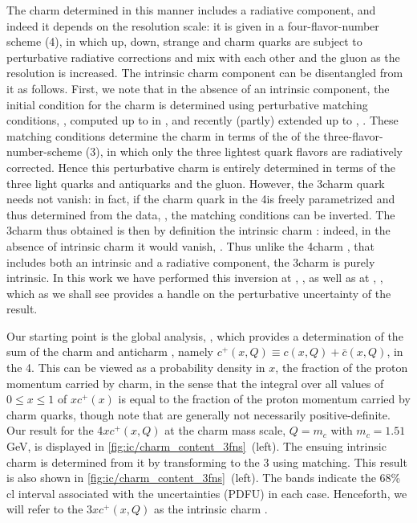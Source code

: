 The charm \pdf determined in this manner includes a  radiative component, and
indeed it depends on the resolution scale: it is  given in a four-flavor-number
scheme (4\fns), in which up,  down, strange and charm quarks are subject to 
perturbative radiative corrections and mix with each other and the gluon as the
resolution is increased.
%
The intrinsic charm component can be disentangled from it as follows.
%
First, we note that in the absence of an intrinsic component, the initial
condition for the charm \pdf is determined using perturbative matching
conditions, \cite{Collins:1986mp}, computed  up to \nnlo in \cite{pdfnnlo},
and recently (partly) extended up to \nnnlo,
\cite{Bierenbaum:2009zt,Bierenbaum:2009mv,Ablinger:2010ty,Ablinger:2014vwa,Ablinger:2014uka,Behring:2014eya,Ablinger_2014,Ablinger:2014nga,Blumlein:2017wxd}.
%
These matching conditions  determine the charm \pdf in terms of the \pdfs of
the three-flavor-number-scheme (3\fns), in which only the three lightest quark 
flavors are radiatively corrected.
%
Hence this perturbative charm \pdf is entirely determined in terms of the three
light quarks and antiquarks and the gluon.
%
However, the 3\fns charm quark \pdf needs not vanish: in fact, if the charm
quark \pdf in the 4\fns is freely parametrized and thus determined from the
data, \cite{Ball:2015tna}, the matching conditions can be inverted.
%
The 3\fns charm \pdf thus obtained is then by definition the intrinsic charm
\pdf: indeed, in the absence of intrinsic charm it would
vanish, \cite{Ball:2015dpa}. 
Thus unlike the 4\fns charm \pdf, that includes both an intrinsic and a
radiative component, the 3\fns charm \pdf is purely intrinsic.
%
In this work we have performed this inversion at
\nnlo, \cite{pdfnnlo}, as well as at \nnnlo,
\cite{Bierenbaum:2009zt,Bierenbaum:2009mv,Ablinger:2010ty,Ablinger:2014vwa,Ablinger:2014uka,Behring:2014eya,Ablinger_2014,Ablinger:2014nga,Blumlein:2017wxd},
which as we shall see provides a handle on the perturbative uncertainty of the
\nnlo result.

Our starting point is the  global analysis, \cite{Ball:2021leu}, which
provides a determination of the sum of the charm and anticharm \pdfs, namely 
$c^+(x,Q)\equiv c(x,Q)+\bar  c(x,Q)$, in the 4\fns. 
This can be viewed  as a probability density in $x$, the fraction of the proton
momentum carried by charm, in the sense that the integral over all  values of
$0\le x\le1$ of  $xc^+(x)$ is equal to  the fraction of the proton momentum
carried by charm quarks, though note that \pdfs are generally not necessarily
positive-definite. 
%
Our result for  the 4\fns $xc^+(x,Q)$  at the charm mass scale, $Q=m_c$ with
$m_c=1.51$ GeV,  is displayed in \cref{fig:ic/charm_content_3fns}~(left).
%
The ensuing intrinsic charm is determined from it by transforming to the 3\fns
using \nnlo matching.
%
This result is also shown  in \cref{fig:ic/charm_content_3fns}~(left).
The bands indicate the 68\% \acrfull{cl} interval associated with the \pdf
uncertainties (PDFU) in each case.
Henceforth, we will refer to the 3\fns $xc^+(x,Q)$ \pdf as the intrinsic charm
\pdf. 

